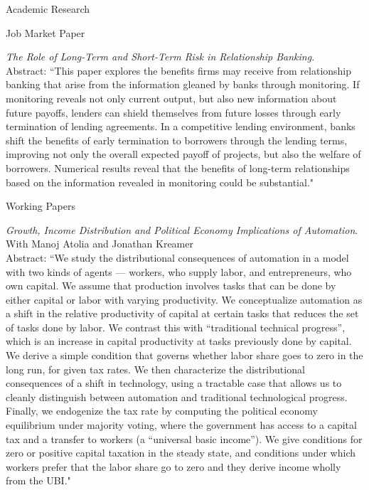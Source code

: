\documentclass{resume} %
\begin{document}
\begin{rSection}{Academic Research}
	    \begin{rSubsection}{Job Market Paper}{}{}{}
		\item \emph{The Role of Long-Term and Short-Term Risk in Relationship Banking}.\\
		Abstract: ``This paper explores the benefits firms may receive from relationship banking that arise from the information gleaned by banks through monitoring. If monitoring reveals not only current output, but also new information about future payoffs, lenders can shield themselves from future losses through early termination of lending agreements. In a competitive lending environment, banks shift the benefits of early termination to borrowers through the lending terms, improving not only the overall expected payoff of projects, but also the welfare of borrowers. Numerical results reveal that the benefits of long-term relationships based on the information revealed in monitoring could be substantial."
		\end{rSubsection}
	
		\begin{rSubsection}{Working Papers}{}{}{}

		\item \emph{Growth, Income Distribution and Political Economy Implications of Automation}. With Manoj Atolia and Jonathan Kreamer\\
		Abstract: ``We study the distributional consequences of automation in a model with two kinds of agents --- workers, who supply labor, and entrepreneurs, who own capital. We assume that production involves tasks that can be done by either capital or labor with varying productivity. We conceptualize automation as a shift in the relative productivity of capital at certain tasks that reduces the set of tasks done by labor. We contrast this with ``traditional technical progress'', which is an increase in capital productivity at tasks previously done by capital. We derive a simple condition that governs whether labor share goes to zero in the long run, for given tax rates. We then characterize the distributional consequences of a shift in technology, using a tractable case that allows us to cleanly distinguish between automation and traditional technological progress. Finally, we endogenize the tax rate by computing the political economy equilibrium under majority voting, where the government has access to a capital tax and a transfer to workers (a ``universal basic income''). We give conditions for zero or positive capital taxation in the steady state, and conditions under which workers prefer that the labor share go to zero and they derive income wholly from the UBI." \\
	\end{rSubsection}
	

\end{rSection}
\end{document}
